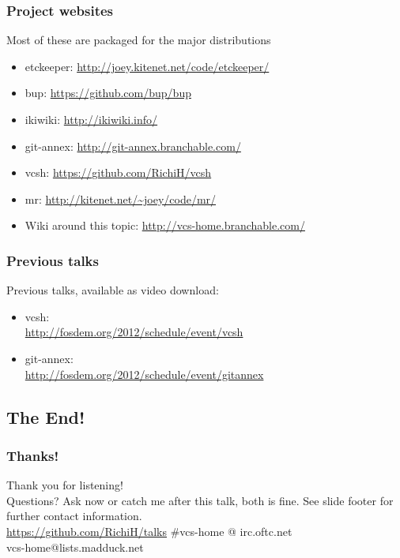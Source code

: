 \documentclass[t]{beamer}
\begin{document}
\begin{frame}
	\frametitle{Project websites}
	Most of these are packaged for the major distributions
	\begin{itemize}
		\item etckeeper: \url{http://joey.kitenet.net/code/etckeeper/}
		\item bup: \url{https://github.com/bup/bup}
		\item ikiwiki: \url{http://ikiwiki.info/}
		\item git-annex: \url{http://git-annex.branchable.com/}
		\item vcsh: \url{https://github.com/RichiH/vcsh}
		\item mr: \url{http://kitenet.net/~joey/code/mr/}
		\item Wiki around this topic: \url{http://vcs-home.branchable.com/}
	\end{itemize}
\end{frame}

\begin{frame}
	\frametitle{Previous talks}
	Previous talks, available as video download:
	\begin{itemize}
		\item vcsh: \\
			\url{http://fosdem.org/2012/schedule/event/vcsh}
		\item git-annex: \\
			\url{http://fosdem.org/2012/schedule/event/gitannex}
	\end{itemize}
\end{frame}

\subsection{The End!}

\begin{frame}
	\frametitle{Thanks!}
		\begin{center}
			\vfill
			Thank you for listening!\\
			\vfill
			Questions? Ask now or catch me after this talk, both is fine.
			\vfill
			See slide footer for further contact information.\\
			\vfill
			\url{https://github.com/RichiH/talks}
			\vfill
			\#vcs-home @ irc.oftc.net\\
			vcs-home@lists.madduck.net
			\vfill
		\end{center}
\end{frame}
\end{document}
